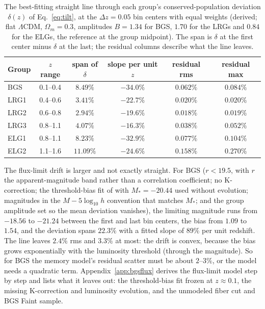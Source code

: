 \documentclass[11pt]{article}
\begin{document}
\begin{table}[ht]
  \centering
  \begin{tabular}{lccccc}
    \hline
    Group & $z$ range & span of $\delta$ & slope per unit $z$ &
    residual rms & residual max \\
    \hline
    BGS  & 0.1--0.4 & $8.49\%$  & $-34.0\%$ & $0.062\%$ & $0.084\%$ \\
    LRG1 & 0.4--0.6 & $3.41\%$  & $-22.7\%$ & $0.020\%$ & $0.020\%$ \\
    LRG2 & 0.6--0.8 & $2.94\%$  & $-19.6\%$ & $0.018\%$ & $0.019\%$ \\
    LRG3 & 0.8--1.1 & $4.07\%$  & $-16.3\%$ & $0.038\%$ & $0.052\%$ \\
    ELG1 & 0.8--1.1 & $8.23\%$  & $-32.9\%$ & $0.077\%$ & $0.104\%$ \\
    ELG2 & 1.1--1.6 & $11.09\%$ & $-24.6\%$ & $0.158\%$ & $0.270\%$ \\
    \hline
  \end{tabular}
  \caption{The best-fitting straight line through each group's
    conserved-population deviation $\delta(z)$ of
    Eq.~\eqref{eq:tilt}, at the $\Delta z = 0.05$ bin centers with
    equal weights (derived; flat $\Lambda$CDM, $\Omega_m = 0.3$,
    amplitudes $B = 1.34$ for BGS, $1.70$ for the LRGs and $0.84$
    for the ELGs, the reference at the group midpoint).  The span is
    $\delta$ at the first center minus $\delta$ at the last; the
    residual columns describe what the line leaves.}
  \label{tab:linefit}
\end{table}

The flux-limit drift is larger and not exactly straight.  For BGS
($r < 19.5$, with $r$ the apparent-magnitude band rather than a
correlation coefficient; no K-correction; the threshold-bias fit of
\cite{Zehavi2011} with $M_* = -20.44$ used without evolution;
magnitudes in the $M - 5\log_{10} h$ convention that matches
$M_*$; and the group amplitude set so the mean deviation vanishes),
the
limiting magnitude runs from $-18.56$ to $-21.24$ between the first
and last bin centers, the bias from $1.09$ to $1.54$, and the
deviation spans $22.3\%$ with a fitted slope of $89\%$ per unit
redshift.  The line leaves $2.4\%$ rms and $3.3\%$ at most: the
drift is convex, because the bias grows exponentially with the
luminosity threshold (through the magnitude).  So for BGS the memory
model's residual scatter must be about $2$--$3\%$, or the model
needs a quadratic term.  Appendix~\ref{app:bgsflux} derives the
flux-limit model step by step and lists what it leaves out: the
threshold-bias fit frozen at $z \approx 0.1$, the missing
K-correction and luminosity evolution, and the unmodeled fiber cut
and BGS Faint sample.
\end{document}
